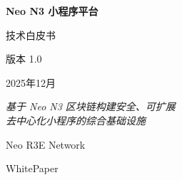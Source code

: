\documentclass[11pt,a4paper]{article}
\begin{document}
\begin{titlepage}
\centering
\vspace*{2cm}
{\Huge\bfseries\textcolor{neoblue}{Neo N3 小程序平台}\par}
\vspace{0.5cm}
{\Large\textcolor{neogreen}{技术白皮书}\par}
\vspace{2cm}
{\large 版本 1.0\par}
{\large 2025年12月\par}
\vspace{3cm}
{\large\textit{基于 Neo N3 区块链构建安全、可扩展\\去中心化小程序的综合基础设施}\par}
\vspace{2cm}
\begin{abstract}
\noindent
Neo N3 小程序平台代表了去中心化应用开发的范式转变，提供了一个综合基础设施，弥合了传统 Web2 用户体验与区块链技术安全保障之间的鸿沟。本白皮书介绍了该平台的技术架构、安全模型和运营框架，旨在使开发者能够在安全的沙箱环境中构建、部署和运营轻量级去中心化应用——即小程序（MiniApps）。通过利用基于 AWS Nitro 技术的可信执行环境（TEE）和 Nitro runtime 执行层，平台确保密钥管理、交易签名和随机数生成等敏感操作在硬件保护的飞地中执行。平台强制执行严格的资产分离，规定所有支付操作使用 GAS 代币，治理活动使用 bNEO（Burger NEO）代币，从而确保合规性和利益相关者的一致性。凭借七个基础智能合约、六个基于 TEE 的服务，以及涵盖游戏、去中心化金融、社交互动和治理领域的二十三个生产就绪的内置应用，Neo N3 小程序平台为安全且易于访问的区块链应用开发树立了新标准。
\end{abstract}
\vfill
{\small Neo R3E Network\par}
{\small WhitePaper\par}
\end{titlepage}

\newpage

\noindent{}

\vspace{1em}
\tableofcontents
\newpage

\end{document}
